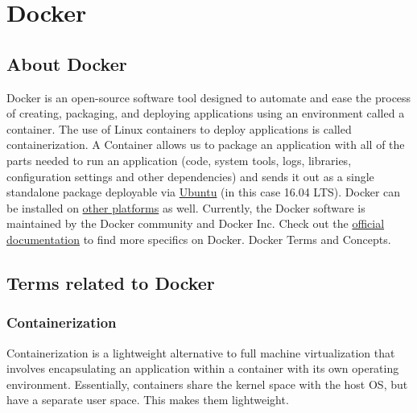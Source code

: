 \documentclass[12pt]{article}
\begin{document}
\section{Docker \cite{Docker}}
\subsection{About Docker}
Docker is an open-source software tool designed to automate and ease the process of creating, packaging, and deploying applications using an environment called a container. The use of Linux containers to deploy applications is called containerization. A Container allows us to package an application with all of the parts needed to run an application (code, system tools, logs, libraries, configuration settings and other dependencies) and sends it out as a single standalone package deployable via \href{https://goo.gl/f77a2v}{Ubuntu} (in this case 16.04 LTS). Docker can be installed on \href{https://goo.gl/iTES81}{other platforms} as well. Currently, the Docker software is maintained by the Docker community and Docker Inc. Check out the \href{https://docs.docker.com/}{official documentation} to find more specifics on Docker. Docker Terms and Concepts. 
\subsection{Terms related to Docker}
\subsubsection{Containerization}
Containerization is a lightweight alternative to full machine virtualization that involves encapsulating an application within a container with its own operating environment. Essentially, containers share the kernel space with the host OS, but have a separate user space. This makes them lightweight.
\end{document}
